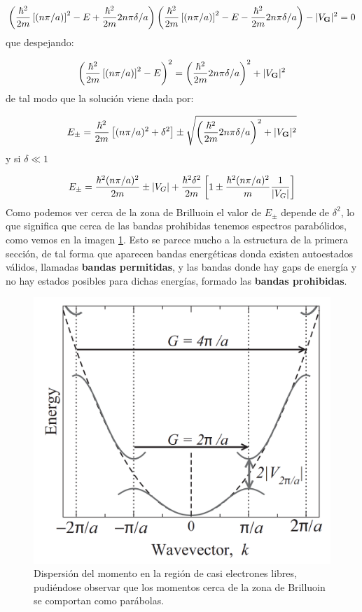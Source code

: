 \begin{equation}
	\left( \frac{\hbar^2}{2m} \left[ (n\pi/a) \right]^2 - E + \frac{\hbar^2}{2m} 2 n \pi \delta / a  \right) \left( \frac{\hbar^2}{2m} \left[ (n\pi/a) \right]^2 - E - \frac{\hbar^2}{2m} 2 n \pi \delta / a  \right) - |V_{\mathbf{G}}|^2 = 0
\end{equation}
que despejando:

\begin{equation}
	\left( \frac{\hbar^2}{2m} \left[ (n\pi/a) \right]^2 - E  \right)^2 = \left(  \frac{\hbar^2}{2m} 2 n \pi \delta / a  \right)^2+|V_{\mathbf{G}}|^2 
\end{equation}
de tal modo que la solución viene dada por: 

\begin{equation}
	E_\pm = \frac{\hbar^2}{2m} \left[ (n\pi/a)^2+\delta^2 \right] \pm \sqrt{\left(  \frac{\hbar^2}{2m} 2 n \pi \delta / a  \right)^2+|V_{\mathbf{G}}|^2 }
\end{equation}
y si $\delta \ll 1$

\begin{equation}
	E_\pm = \frac{\hbar^2(n\pi/a)^2}{2m} \pm |V_G| + \frac{\hbar^2 \delta^2}{2m}\left[ 1\pm \frac{\hbar^2 (n\pi/a)^2}{m} \frac{1}{|V_G|} \right]
\end{equation}
Como podemos ver cerca de la zona de Brilluoin el valor de $E_\pm$ depende de $\delta^2$, lo  que significa que cerca de las bandas prohibidas tenemos espectros parabólidos, como vemos en la imagen \ref{Fig:07-02}. Esto se parece mucho a la estructura de la primera sección, de tal forma que aparecen bandas energéticas donda existen autoestados válidos, llamadas \textbf{bandas permitidas}, y las bandas donde hay gaps de energía y no hay estados posibles para dichas energías, formado las \textbf{bandas prohibidas}.

\begin{figure}[h!] \centering
	\includegraphics[scale=0.45]{Cuerpo/Ch_07/Oxford-02.png}
	\caption{Dispersión del momento en la región de casi electrones libres, pudiéndose observar que los momentos cerca de la zona de Brilluoin se comportan como parábolas.}
	\label{Fig:07-02}
\end{figure}    
	
